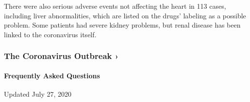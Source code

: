 There were also serious adverse events not affecting the heart in 113
cases, including liver abnormalities, which are listed on the drugs'
labeling as a possible problem. Some patients had severe kidney
problems, but renal disease has been linked to the coronavirus itself.

\href{https://www.nytimes3xbfgragh.onion/news-event/coronavirus?action=click\&pgtype=Article\&state=default\&region=MAIN_CONTENT_3\&context=storylines_faq}{}

\hypertarget{the-coronavirus-outbreak-}{%
\subsubsection{The Coronavirus Outbreak
›}\label{the-coronavirus-outbreak-}}

\hypertarget{frequently-asked-questions}{%
\paragraph{Frequently Asked
Questions}\label{frequently-asked-questions}}

Updated July 27, 2020

